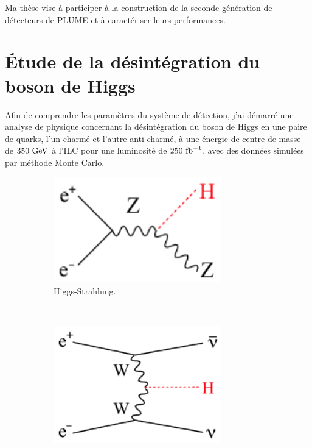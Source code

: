   Ma thèse vise à participer à la construction de la seconde génération de détecteurs de PLUME et à caractériser leurs performances.

  \section{Étude de la désintégration du boson de Higgs}

  Afin de comprendre les paramètres du système de détection, j'ai démarré une analyse de physique concernant la désintégration du boson de Higgs en une paire de quarks, l'un charmé et l'autre anti-charmé, à une énergie de centre de masse de $350~\rm{GeV}$ à l'ILC pour une luminosité de $250~\rm{fb}^{-1}$, avec des données simulées par méthode Monte Carlo.

    \begin{figure}  
        \centering
        \begin{subfigure}[t]{0.3\textwidth}
            \includegraphics[width = 0.8\textwidth]{Pictures/Higgs/Chapter_Theory_figs_ZHdiagram.png}
            \caption{Higgs-Strahlung.}
            \label{fig:higgsStrahlung_resume}
        \end{subfigure}
        ~%
        \begin{subfigure}[t]{0.3\textwidth}
            \includegraphics[width = 0.8\textwidth]{Pictures/Higgs/Chapter_Theory_figs_nunuHdiagram.png}

\end{subfigure}
\end{figure}
